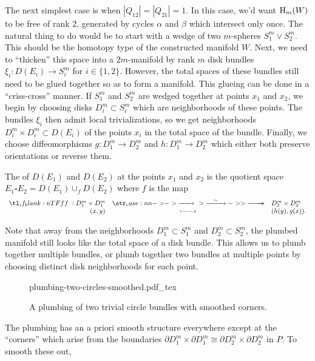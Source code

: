 The next simplest case is when $|Q_{12}|=|Q_{21}|=1$. In this case, we'd want $\operatorname{H}_m(W)$ to be free of rank $2$, generated by cycles $\alpha$ and $\beta$ which intersect only once. The natural thing to do would be to start with a wedge of two $m$-spheres $S^m_1\vee S^m_2$. This should be the homotopy type of the constructed manifold $W$. Next, we need to ``thicken'' this space into a $2m$-manifold by rank $m$ disk bundles $\xi_i : D(E_i) \to S^m_i$ for $i\in\{1,2\}$. However, the total spaces of these bundles still need to be glued together so as to form a manifold. This glueing can be done in a ``criss-cross'' manner. If $S^m_1$ and $S^m_2$ are wedged together at points $x_1$ and $x_2$, we begin by choosing disks $D_i^m\subset S^m_i$ which are neighborhoods of these points. The bundles $\xi_i$ then admit local trivializations, so we get neighborhoods $D_i^m\times D^m_i \subset D(E_i)$ of the points $x_i$ in the total space of the bundle. Finally, we choose diffeomorphisms $g : D_1^m \to D_2^m$ and $h : D_1^m \to D_2^m$ which either both preserve orientations or reverse them.

\begin{definition}\label{def:plumbing}
	The  of $D(E_1)$ and $D(E_2)$ at the points $x_1$ and $x_2$ is the quotient space $E_1\square E_2 =D(E_1)\cup_f D(E_2)$ where $f$ is the map
	\[
		\lkxfunc{f}{D_1^m\times D_1^m}{D_2^m\times D_2^m}{(x,y)}{(h(y), g(x)).}
	\]
\end{definition}

Note that away from the neighborhoods $D_1^m\subset S^m_1$ and $D_2^m\subset S^m_2$, the plumbed manifold still looks like the total space of a disk bundle. This allows us to plumb together multiple bundles, or plumb together two bundles at multiple points by choosing distinct disk neighborhoods for each point.

\begin{figure}[ht]
	\centering
	{plumbing-two-circles-smoothed.pdf_tex}
	\caption{A plumbing of two trivial circle bundles with smoothed corners.}\label{fig:plumbing-two-circles}
\end{figure}

\begin{remark}\label{rmk:smoothing-corners}
	The plumbing has an a priori smooth structure everywhere except at the ``corners'' which arise from the boundaries $\partial D_1^m\times \partial D_1^m \cong \partial D_2^m\times \partial D_2^m$ in $P$. To smooth these out, 
\end{remark}

